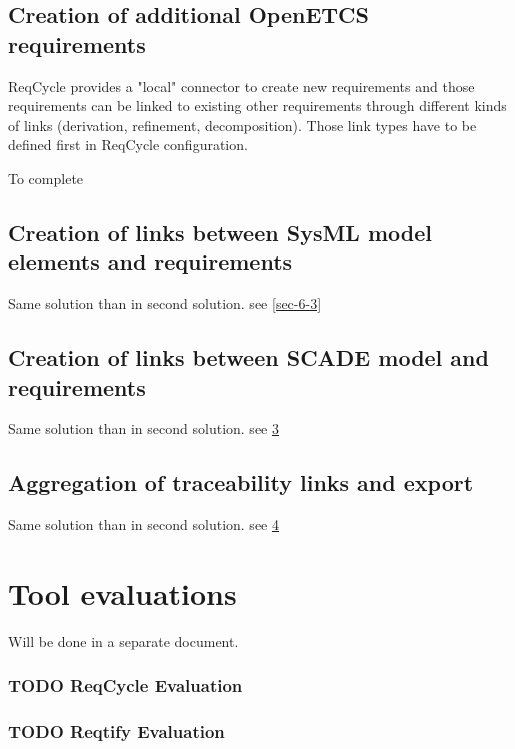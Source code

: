 \documentclass[11pt]{template/openetcs_report}
\begin{document}
\section{Creation of additional OpenETCS requirements}
\label{sec-7-2}
ReqCycle provides a "local" connector to create new requirements and those requirements can be linked to existing other requirements through different kinds of links (derivation, refinement, decomposition). Those link types have to be defined first in ReqCycle configuration.

To complete

\section{Creation of links between SysML model elements and requirements}
\label{sec-7-3}
Same solution than in second solution. see \ref{sec-6-3}

\section{Creation of links between SCADE model and requirements}
\label{sec-6-4}
Same solution than in second solution. see \ref{sec-6-4}

\section{Aggregation of traceability links and export}
\label{sec-6-5}
Same solution than in second solution. see \ref{sec-6-5}



\chapter{Tool evaluations}
Will be done in a separate document.
\subsection{{\bfseries\sffamily TODO} ReqCycle  Evaluation}
\label{sec-4-5}
\subsection{{\bfseries\sffamily TODO} Reqtify Evaluation}
\label{sec-4-6}



\end{document}
